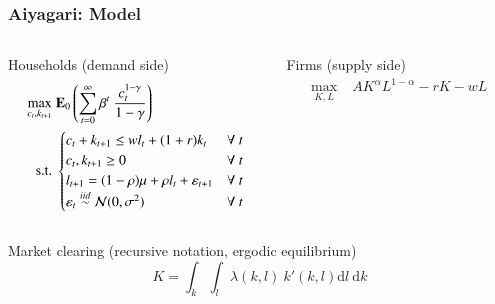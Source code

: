\documentclass[10pt, aspectratio=1610, natbib, handout]{beamer}
\begin{document}
  \begin{frame}
    \frametitle{Aiyagari: Model}

    \begin{columns}[T]
      \begin{column}{0.45\textwidth}
        Households (demand side)
        \begin{align*}
          \max_{c_t, k_{t+1}} &\; \mathbf{E}_0 \left( \sum_{t=0}^{\infty} \beta^t\ \frac{c_t^{1-\gamma}}{1-\gamma} \right) \\
          \text{s.t.} &\;
          \begin{cases}
            c_t + k_{t+1} \leq w l_t + (1 + r) k_t & \forall\ t \\
            c_t, k_{t+1} \geq 0 & \forall\ t \\
            l_{t+1} = (1 - \rho) \mu + \rho l_t + \varepsilon_{t+1} & \forall\ t \\
            \varepsilon_t \overset{iid}{\sim} \mathcal{N}(0, \sigma^2) & \forall\ t
          \end{cases}
        \end{align*}
      \end{column}
      \begin{column}{0.45\textwidth}
        Firms (supply side) \\ 
        \begin{align*}
          \max_{K, L} &\; A K^\alpha L^{1-\alpha} - r K - w L
        \end{align*}
      \end{column}
    \end{columns}

    \vfill\pause

    Market clearing (recursive notation, ergodic equilibrium)
    \begin{equation*}
      K = \int_{k} \int_{l} \lambda(k, l)\ k'(k, l) \text{d} l\ \text{d} k
    \end{equation*}

  \end{frame}
\end{document}

